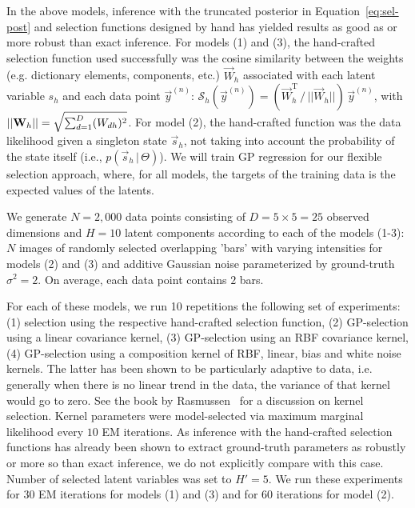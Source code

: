 In the above models, inference with the truncated posterior in Equation~\eqref{eq:sel-post} and selection functions designed by hand has yielded results as good as or more robust than exact inference.
For models (1) and (3), the hand-crafted selection function used successfully was the cosine similarity between the weights (e.g. dictionary elements, components, etc.) $\vec{W}_h$ associated with each latent variable $s_h$ and each data point $\vec{y}^{(n)}$: $  \mathcal{S}_h(\vec{y}^{(n)}) = (\vec{W}_{h}^{\mathrm{T}}\,/\,||\vec{W}_{h}||)\,\vec{y}^{(n)}$, with $\textstyle ||{\mathbf{W}}_{h}||=\sqrt{\sum_{d=1}^D(W_{dh})^2}$.
For model (2), the hand-crafted function was the data likelihood given a singleton state $\vec{s}_h$, not taking into account
the probability of the state itself  (i.e., $p(\vec{s}_h\,|\,\Theta)$).
We will train GP regression for our flexible selection approach, where, for all models, the targets of the training data is the expected values of the latents.

We generate $N=2,000$ data points consisting of $D=5\times5=25$ observed dimensions and $H=10$ latent components according to each of the models (1-3):
$N$ images of randomly selected overlapping 'bars' with varying intensities for models (2) and (3) and additive Gaussian noise parameterized by ground-truth $\sigma^2 = 2$.
On average, each data point contains $2$ bars.

For each of these models, we run 10 repetitions the following set of experiments: (1) selection using the respective hand-crafted selection function,
(2) GP-selection using a linear covariance kernel, (3) GP-selection using an RBF covariance kernel, (4) GP-selection using a composition kernel of RBF, linear, bias and white noise kernels.
The latter has been shown to be particularly adaptive to data, i.e. generally when there is no linear trend in the data, the variance of that kernel would go to zero. See the book by Rasmussen~\citep{RasmussenGPbook} for a discussion on kernel selection.
Kernel parameters were model-selected via maximum marginal likelihood every $10$ EM iterations.
As inference with the hand-crafted selection functions has already been shown to extract ground-truth parameters as robustly or more so than exact inference, we do not explicitly compare with this case.
Number of selected latent variables was set to $H'=5$.
%
We run these experiments for $30$ EM iterations for models (1) and (3) and for $60$ iterations for model (2).

